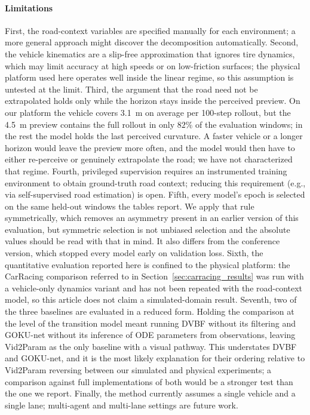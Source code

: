 \documentclass[preprint,12pt]{elsarticle}
\begin{document}
\paragraph{Limitations}
First, the road-context variables are specified manually for each environment; a
more general approach might discover the decomposition automatically.
Second, the vehicle kinematics are a slip-free approximation that ignores tire
dynamics, which may limit accuracy at high speeds or on low-friction surfaces;
the physical platform used here operates well inside the linear regime, so this
assumption is untested at the limit.
Third, the argument that the road need not be extrapolated holds only while the
horizon stays inside the perceived preview.
On our platform the vehicle covers \SI{3.1}{m} on average per 100-step rollout,
but the \SI{4.5}{m} preview contains the full rollout in only $82\%$ of the
evaluation windows; in the rest the model holds the last perceived curvature. A
faster vehicle or a longer horizon would leave the preview more often, and the
model would then have to either re-perceive or genuinely extrapolate the road; we
have not characterized that regime.
Fourth, privileged supervision requires an instrumented training environment to
obtain ground-truth road context; reducing this requirement (e.g., via
self-supervised road estimation) is open.
Fifth, every model's epoch is selected on the same held-out windows the tables
report. We apply that rule symmetrically, which removes an asymmetry present in an
earlier version of this evaluation, but symmetric selection is not unbiased
selection and the absolute values should be read with that in mind. It also differs
from the conference version, which stopped every model early on validation loss.
Sixth, the quantitative evaluation reported here is confined to the physical
platform: the CarRacing comparison referred to in
Section~\ref{sec:carracing_results} was run with a vehicle-only dynamics variant
and has not been repeated with the road-context model, so this article does not
claim a simulated-domain result.
Seventh, two of the three baselines are evaluated in a reduced form. Holding the
comparison at the level of the transition model meant running DVBF without its
filtering and GOKU-net without its inference of ODE parameters from observations,
leaving Vid2Param as the only baseline with a visual pathway. This understates
DVBF and GOKU-net, and it is the most likely explanation for their ordering
relative to Vid2Param reversing between our simulated and physical experiments;
a comparison against full implementations of both would be a stronger test than
the one we report.
Finally, the method currently assumes a single vehicle and a single lane;
multi-agent and multi-lane settings are future work.
\end{document}
